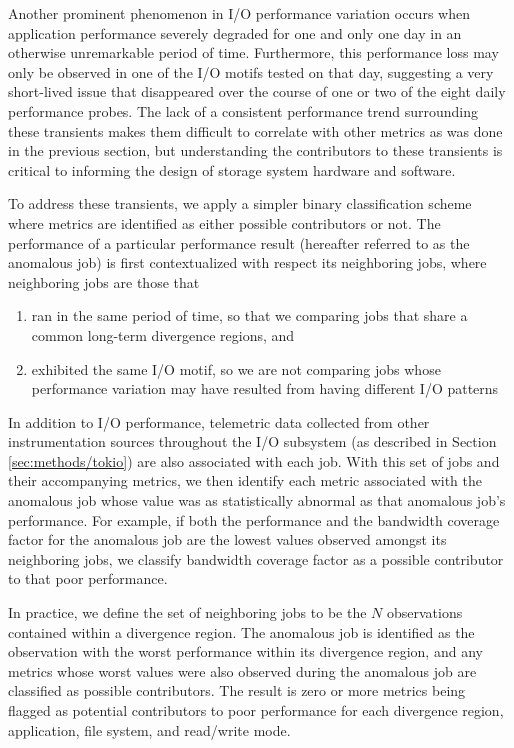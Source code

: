 Another prominent phenomenon in I/O performance variation occurs when application performance severely degraded for one and only one day in an otherwise unremarkable period of time.
Furthermore, this performance loss may only be observed in one of the I/O motifs tested on that day, suggesting a very short-lived issue that disappeared over the course of one or two of the eight daily performance probes.
The lack of a consistent performance trend surrounding these transients makes them difficult to correlate with other metrics as was done in the previous section, but understanding the contributors to these transients is critical to informing the design of storage system hardware and software.

To address these transients, we apply a simpler binary classification scheme where metrics are identified as either possible contributors or not.
The performance of a particular performance result (hereafter referred to as the anomalous job) is first contextualized with respect its neighboring jobs, where neighboring jobs are those that

\begin{enumerate}[leftmargin=*]
\item ran in the same period of time, so that we comparing jobs that share a common long-term divergence regions, and
\item exhibited the same I/O motif, so we are not comparing jobs whose performance variation may have resulted from having different I/O patterns
\end{enumerate}

In addition to I/O performance, telemetric data collected from other instrumentation sources throughout the I/O subsystem (as described in Section \ref{sec:methods/tokio}) are also associated with each job.
With this set of jobs and their accompanying metrics, we then identify each metric associated with the anomalous job whose value was as statistically abnormal as that anomalous job's performance.
For example, if both the performance and the bandwidth coverage factor for the anomalous job are the lowest values observed amongst its neighboring jobs, we classify bandwidth coverage factor as a possible contributor to that poor performance.

In practice, we define the set of neighboring jobs to be the $N$ observations contained within a divergence region.
The anomalous job is identified as the observation with the worst performance within its divergence region, and any metrics whose worst values were also observed during the anomalous job are classified as possible contributors.
The result is zero or more metrics being flagged as potential contributors to poor performance for each divergence region, application, file system, and read/write mode.

